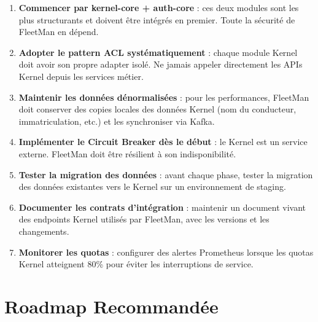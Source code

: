 \documentclass[12pt,a4paper]{report}
\begin{document}
\begin{enumerate}[leftmargin=2cm]
  \item \textbf{Commencer par kernel-core + auth-core} : ces deux modules
        sont les plus structurants et doivent être intégrés en premier.
        Toute la sécurité de FleetMan en dépend.

  \item \textbf{Adopter le pattern ACL systématiquement} : chaque module
        Kernel doit avoir son propre adapter isolé. Ne jamais appeler
        directement les APIs Kernel depuis les services métier.

  \item \textbf{Maintenir les données dénormalisées} : pour les performances,
        FleetMan doit conserver des copies locales des données Kernel
        (nom du conducteur, immatriculation, etc.) et les synchroniser
        via Kafka.

  \item \textbf{Implémenter le Circuit Breaker dès le début} : le Kernel
        est un service externe. FleetMan doit être résilient à son
        indisponibilité.

  \item \textbf{Tester la migration des données} : avant chaque phase,
        tester la migration des données existantes vers le Kernel sur
        un environnement de staging.

  \item \textbf{Documenter les contrats d'intégration} : maintenir un
        document vivant des endpoints Kernel utilisés par FleetMan,
        avec les versions et les changements.

  \item \textbf{Monitorer les quotas} : configurer des alertes Prometheus
        lorsque les quotas Kernel atteignent 80\% pour éviter les
        interruptions de service.
\end{enumerate}

\section{Roadmap Recommandée}
\end{document}
